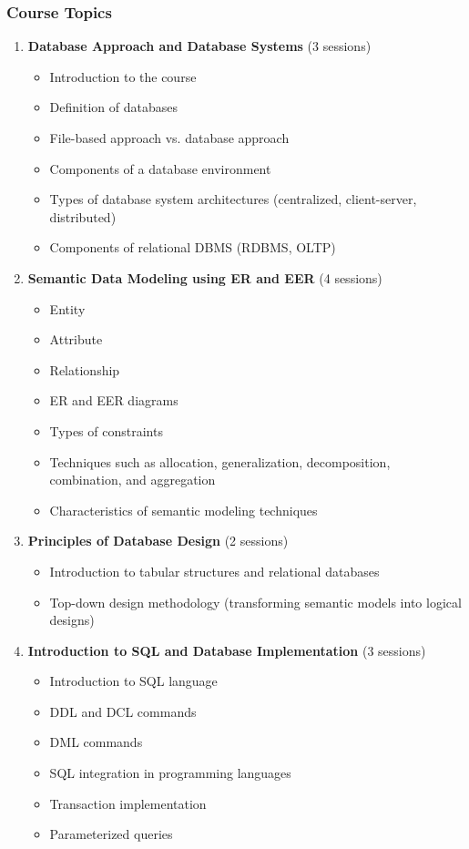 \documentclass[12pt]{article}
\begin{document}
\subsubsection*{Course Topics}
\begin{enumerate}
    \item \textbf{Database Approach and Database Systems} (3 sessions)
        \begin{itemize}
            \item Introduction to the course
            \item Definition of databases
            \item File-based approach vs. database approach
            \item Components of a database environment
            \item Types of database system architectures (centralized, client-server, distributed)
            \item Components of relational DBMS (RDBMS, OLTP)
        \end{itemize}
    
    \item \textbf{Semantic Data Modeling using ER and EER} (4 sessions)
        \begin{itemize}
            \item Entity
            \item Attribute
            \item Relationship
            \item ER and EER diagrams
            \item Types of constraints
            \item Techniques such as allocation, generalization, decomposition, combination, and aggregation
            \item Characteristics of semantic modeling techniques
        \end{itemize}

    \item \textbf{Principles of Database Design} (2 sessions)
        \begin{itemize}
            \item Introduction to tabular structures and relational databases
            \item Top-down design methodology (transforming semantic models into logical designs)
        \end{itemize}
    
    \item \textbf{Introduction to SQL and Database Implementation} (3 sessions)
        \begin{itemize}
            \item Introduction to SQL language
            \item DDL and DCL commands
            \item DML commands
            \item SQL integration in programming languages
            \item Transaction implementation
            \item Parameterized queries
        \end{itemize}


\end{enumerate}
\end{document}
